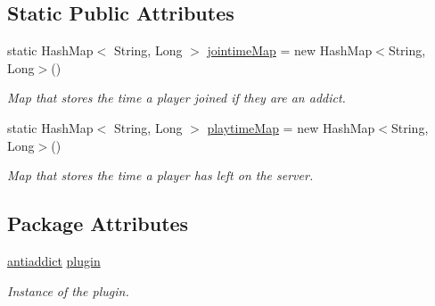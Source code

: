 \subsection*{\-Static \-Public \-Attributes}
\begin{DoxyCompactItemize}
\item 
\hypertarget{classcom_1_1github_1_1zephyrz4_1_1antiaddict_1_1listeners_1_1players_a9b60bfe249ff198620637a98f6a3ef30}{static \-Hash\-Map$<$ \-String, \-Long $>$ \hyperlink{classcom_1_1github_1_1zephyrz4_1_1antiaddict_1_1listeners_1_1players_a9b60bfe249ff198620637a98f6a3ef30}{jointime\-Map} = new \-Hash\-Map$<$\-String, \-Long$>$()}\label{classcom_1_1github_1_1zephyrz4_1_1antiaddict_1_1listeners_1_1players_a9b60bfe249ff198620637a98f6a3ef30}

\begin{DoxyCompactList}\small\item\em \-Map that stores the time a player joined if they are an addict. \end{DoxyCompactList}\item 
\hypertarget{classcom_1_1github_1_1zephyrz4_1_1antiaddict_1_1listeners_1_1players_a174c64fb76f42a07a93d0fd7450deb6f}{static \-Hash\-Map$<$ \-String, \-Long $>$ \hyperlink{classcom_1_1github_1_1zephyrz4_1_1antiaddict_1_1listeners_1_1players_a174c64fb76f42a07a93d0fd7450deb6f}{playtime\-Map} = new \-Hash\-Map$<$\-String, \-Long$>$()}\label{classcom_1_1github_1_1zephyrz4_1_1antiaddict_1_1listeners_1_1players_a174c64fb76f42a07a93d0fd7450deb6f}

\begin{DoxyCompactList}\small\item\em \-Map that stores the time a player has left on the server. \end{DoxyCompactList}\end{DoxyCompactItemize}
\subsection*{\-Package \-Attributes}
\begin{DoxyCompactItemize}
\item 
\hypertarget{classcom_1_1github_1_1zephyrz4_1_1antiaddict_1_1listeners_1_1players_aff372496fd4a51243587dfa9fdad87de}{\hyperlink{classcom_1_1github_1_1zephyrz4_1_1antiaddict_1_1antiaddict}{antiaddict} \hyperlink{classcom_1_1github_1_1zephyrz4_1_1antiaddict_1_1listeners_1_1players_aff372496fd4a51243587dfa9fdad87de}{plugin}}\label{classcom_1_1github_1_1zephyrz4_1_1antiaddict_1_1listeners_1_1players_aff372496fd4a51243587dfa9fdad87de}

\begin{DoxyCompactList}\small\item\em \-Instance of the plugin. \end{DoxyCompactList}\end{DoxyCompactItemize}


